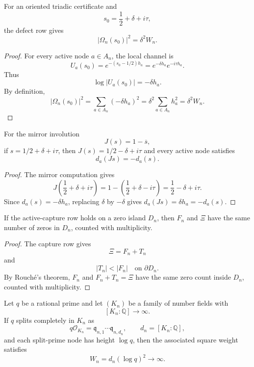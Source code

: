 \begin{proposition}
\label{prop:unified-reality-oriented-certificate-defect-square-energy}
For an oriented triadic certificate and
$$
s_0=\frac12+\delta+i\tau,
$$
the defect row gives
$$
|\Omega_n(s_0)|^2=\delta^2W_n.
$$
\end{proposition}

\begin{proof}
For every active node $a\in A_n$, the local channel is
$$
U_a(s_0)=e^{-(s_0-1/2)h_a}
=
e^{-\delta h_a}e^{-i\tau h_a}.
$$
Thus
$$
\log|U_a(s_0)|=-\delta h_a.
$$
By definition,
$$
|\Omega_n(s_0)|^2
=
\sum_{a\in A_n}(-\delta h_a)^2
=
\delta^2\sum_{a\in A_n}h_a^2
=
\delta^2W_n.
$$
\end{proof}

\begin{proposition}
\label{prop:unified-reality-oriented-certificate-normal-defect-parity}
For the mirror involution
$$
J(s)=1-\overline{s},
$$
if $s=1/2+\delta+i\tau$, then $J(s)=1/2-\delta+i\tau$ and every active
node satisfies
$$
d_a(Js)=-d_a(s).
$$
\end{proposition}

\begin{proof}
The mirror computation gives
$$
J\left(\frac12+\delta+i\tau\right)
=
1-\left(\frac12+\delta-i\tau\right)
=
\frac12-\delta+i\tau.
$$
Since $d_a(s)=-\delta h_a$, replacing $\delta$ by $-\delta$ gives
$d_a(Js)=\delta h_a=-d_a(s)$.
\end{proof}

\begin{proposition}
\label{prop:unified-reality-active-capture-preserves-zero-count}
If the active-capture row holds on a zero island $D_n$, then $F_n$ and
$\Xi$ have the same number of zeros in $D_n$, counted with
multiplicity.
\end{proposition}

\begin{proof}
The capture row gives
$$
\Xi=F_n+T_n
$$
and
$$
|T_n|<|F_n|
\quad
\text{on }\partial D_n.
$$
By Rouch\'e's theorem, $F_n$ and $F_n+T_n=\Xi$ have the same zero count
inside $D_n$, counted with multiplicity.
\end{proof}

\begin{proposition}
\label{prop:unified-reality-split-prime-tower-cofinal-growth-template}
Let $q$ be a rational prime and let $(K_n)$ be a family of number fields
with
$$
[K_n:\mathbb Q]\to\infty.
$$
If $q$ splits completely in $K_n$ as
$$
q\mathcal O_{K_n}
=
\mathfrak q_{n,1}\cdots\mathfrak q_{n,d_n},
\qquad
d_n=[K_n:\mathbb Q],
$$
and each split-prime node has height $\log q$, then the associated
square weight satisfies
$$
W_n=d_n(\log q)^2\to\infty.
$$
\end{proposition}


